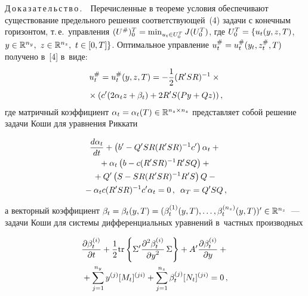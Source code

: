 \begin{multicols}{2}
     \smallskip
     
     \noindent
     Д\,о\,к\,а\,з\,а\,т\,е\,л\,ь\,с\,т\,в\,о\,.\ \ Перечисленные в теореме 
условия обеспечивают существование предельного решения 
соответствующей~(4) задачи с конечным горизонтом, т.\,е.\ управ\-ле\-ния 
     $(U^\#)_0^{{T}}\hm= \min_{u_t\in U_0^{{T}}} J(U_0^{{T}})$, где $U_0^{{T}}\hm= \{ 
u_t(y,z,T)$,\linebreak $y\hm\in \mathbb{R}^{n_y},\ z\hm\in \mathbb{R}^{n_z},\ t\hm\in 
[0,T]\}$. Оптимальное управ\-ле\-ние $u_t^\#\hm= u_t^\# (y_t, z_t^\#, T)$ 
получено в~[4] в~виде:
     \begin{multline}
     u_t^\#= u_t^\# (y,z,T) =-\displaystyle\frac{\displaystyle 1\mathstrut}{\displaystyle 2\mathstrut}(R^\prime SR)^{-1} \times{}\\
     {}\times \left( c^\prime 
(2\alpha_t z+\beta_t)+2R^\prime S(Py+Qz)\right),
     \label{e9-bos}
     \end{multline}
где матричный коэффициент $\alpha_t\hm= \alpha_t(T)\hm\in 
\mathbb{R}^{n_z\times n_z}$ представляет собой решение задачи Коши для 
уравнения Риккати

\vspace*{-3pt}

\noindent
\begin{multline}
\displaystyle\frac{\displaystyle d\alpha_t\mathstrut}{\displaystyle dt\mathstrut} +\left( b^\prime -Q^\prime SR(R^\prime SR)^{-1} c^\prime 
\right)\alpha_t +{}\\[-3pt]
{}+\alpha_t \left (b-c(R^\prime SR)^{-1} R^\prime SQ\right)+{}\\
{}+
Q^\prime \left(S-SR(R^\prime SR)^{-1} R^\prime S\right) Q - {}\\
{}- \alpha_t c 
(R^\prime SR)^{-1}c^\prime \alpha_t=0\,,\enskip \alpha_T=Q^\prime SQ\,,
\label{e10-bos}
\end{multline} 


\noindent
а векторный коэффициент $\beta_t\hm= \beta_t(y,T)\hm= 
(\beta_t^{(1)}(y,T),\ldots , \beta_t^{(n_z)}(y,T))^\prime \hm\in 
\mathbb{R}^{n_z}$~--- задачи Коши для сис\-те\-мы дифференциальных 
уравнений в~част\-ных производных 

\vspace*{-3pt}

\noindent
\begin{multline}
\displaystyle\frac{\displaystyle \partial \beta_t^{(i)}\mathstrut}{\displaystyle \partial t\mathstrut}+\displaystyle\frac{\displaystyle 1\mathstrut}{\displaystyle 2\mathstrut}\mathrm{tr}\left\{ \Sigma^{\prime} 
\displaystyle\frac{\displaystyle \partial^2\beta_t^{(i)}\mathstrut}{\displaystyle \partial y^2\mathstrut}\, \Sigma\right\}+A^\prime 
\displaystyle\frac{\displaystyle \partial\beta_t^{(i)}\mathstrut}{\displaystyle \partial y\mathstrut} +{}\\
{}+\displaystyle \sum\limits_{j=1}^{n_y} 
y^{(j)} [M_t]^{(ji)} +\sum\limits^{n_z}_{j=1} \beta_t^{(j)} 
[N_t]^{(ji)}=0\,,
\label{e11-bos}
\end{multline}


\end{multicols}
